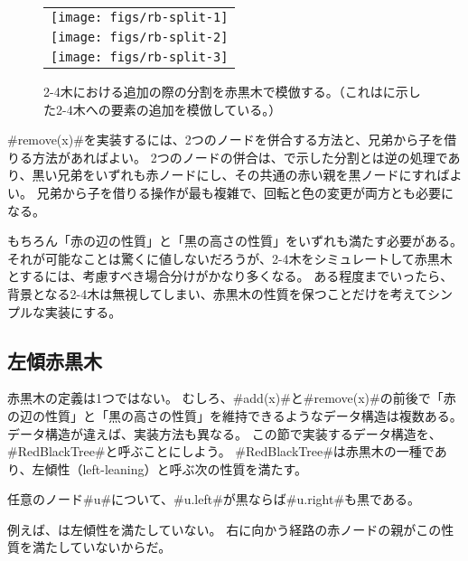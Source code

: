 \begin{figure}
  \begin{center}
   \begin{tabular}{c}
     \texttt{[image: figs/rb-split-1]} \\
     \texttt{[image: figs/rb-split-2]} \\
     \texttt{[image: figs/rb-split-3]} \\
   \end{tabular}
  \end{center}
  \caption{2-4木における追加の際の分割を赤黒木で模倣する。（これはに示した2-4木への要素の追加を模倣している。）}
\end{figure}

#remove(x)#を実装するには、2つのノードを併合する方法と、兄弟から子を借りる方法があればよい。
2つのノードの併合は、で示した分割とは逆の処理であり、黒い兄弟をいずれも赤ノードにし、その共通の赤い親を黒ノードにすればよい。
兄弟から子を借りる操作が最も複雑で、回転と色の変更が両方とも必要になる。

もちろん「赤の辺の性質」と「黒の高さの性質」をいずれも満たす必要がある。
それが可能なことは驚くに値しないだろうが、2-4木をシミュレートして赤黒木とするには、考慮すべき場合分けがかなり多くなる。
ある程度までいったら、背景となる2-4木は無視してしまい、赤黒木の性質を保つことだけを考えてシンプルな実装にする。

\subsection{左傾赤黒木}

%
%
赤黒木の定義は1つではない。
むしろ、#add(x)#と#remove(x)#の前後で「赤の辺の性質」と「黒の高さの性質」を維持できるようなデータ構造は複数ある。
データ構造が違えば、実装方法も異なる。
この節で実装するデータ構造を、#RedBlackTree#と呼ぶことにしよう。
%
#RedBlackTree#は赤黒木の一種であり、左傾性（left-leaning）と呼ぶ次の性質を満たす。
\begin{prp}[左傾性]
  任意のノード#u#について、#u.left#が黒ならば#u.right#も黒である。
\end{prp}
例えば、は左傾性を満たしていない。
右に向かう経路の赤ノードの親がこの性質を満たしていないからだ。


